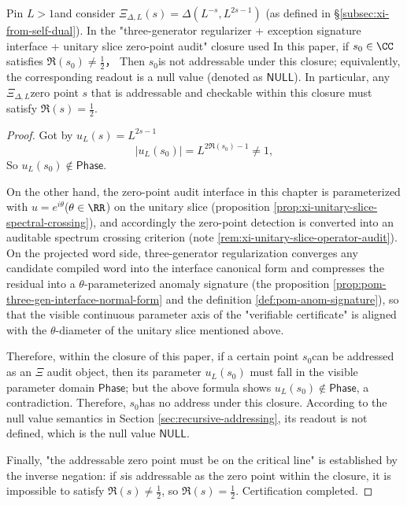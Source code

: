 \begin{theorem}\label{thm:xi-offset-null-type-safety}
Pin \(L>1\) ​​and consider \(\Xi_{\Delta,L}(s)=\Delta(L^{-s},L^{2s-1})\) (as defined in \S\ref{subsec:xi-from-self-dual}).
In the "three-generator regularizer + exception signature interface + unitary slice zero-point audit" closure used In this paper, if \(s_0\in\CC\) ​​satisfies
\(\Re(s_0)\neq \tfrac12\)，
Then \(s_0\) ​​is not addressable under this closure; equivalently, the corresponding readout is a null value (denoted as \(\mathsf{NULL}\)).
In particular, any \(\Xi_{\Delta,L}\) ​​zero point \(s\) that is addressable and checkable within this closure must satisfy \(\Re(s)=\tfrac12\).
\end{theorem}

\begin{proof}
Got by \(u_L(s)=L^{2s-1}\)
\[
|u_L(s_0)|=L^{2\Re(s_0)-1}\neq 1,
\]
So \(u_L(s_0)\notin\mathsf{Phase}\).
\par
On the other hand, the zero-point audit interface in this chapter is parameterized with \(u=e^{i\theta}\) ​​(\(\theta\in\RR\)) on the unitary slice (proposition \ref{prop:xi-unitary-slice-spectral-crossing}), and accordingly the zero-point detection is converted into an auditable spectrum crossing criterion (note \ref{rem:xi-unitary-slice-operator-audit}).
On the projected word side, three-generator regularization converges any candidate compiled word into the interface canonical form and compresses the residual into a \(\theta\)-parameterized anomaly signature (the proposition \ref{prop:pom-three-gen-interface-normal-form} and the definition \ref{def:pom-anom-signature}), so that the visible continuous parameter axis of the "verifiable certificate" is aligned with the \(\theta\)-diameter of the unitary slice mentioned above.
\par
Therefore, within the closure of this paper, if a certain point \(s_0\) ​​can be addressed as an \(\Xi\) audit object, then its parameter \(u_L(s_0)\) must fall in the visible parameter domain \(\mathsf{Phase}\); but the above formula shows \(u_L(s_0)\notin\mathsf{Phase}\), a contradiction.
Therefore, \(s_0\) ​​has no address under this closure. According to the null value semantics in Section \ref{sec:recursive-addressing}, its readout is not defined, which is the null value \(\mathsf{NULL}\).
\par
Finally, "the addressable zero point must be on the critical line" is established by the inverse negation: if \(s\) ​​is addressable as the zero point within the closure, it is impossible to satisfy \(\Re(s)\neq\tfrac12\), so \(\Re(s)=\tfrac12\). Certification completed.
\end{proof}

